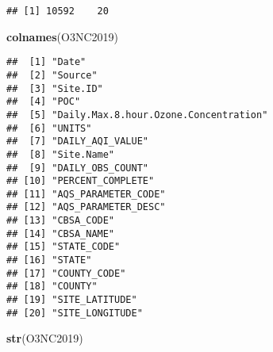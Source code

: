 \documentclass[]{article}
\newenvironment{Shaded}{\begin{snugshade}}{\end{snugshade}}
\newcommand{\KeywordTok}[1]{\textcolor[rgb]{0.13,0.29,0.53}{\textbf{#1}}}
\newcommand{\NormalTok}[1]{#1}
\begin{document}
\begin{verbatim}
## [1] 10592    20
\end{verbatim}

\begin{Shaded}
\begin{Highlighting}[]
\KeywordTok{colnames}\NormalTok{(O3NC2019)}
\end{Highlighting}
\end{Shaded}

\begin{verbatim}
##  [1] "Date"                                
##  [2] "Source"                              
##  [3] "Site.ID"                             
##  [4] "POC"                                 
##  [5] "Daily.Max.8.hour.Ozone.Concentration"
##  [6] "UNITS"                               
##  [7] "DAILY_AQI_VALUE"                     
##  [8] "Site.Name"                           
##  [9] "DAILY_OBS_COUNT"                     
## [10] "PERCENT_COMPLETE"                    
## [11] "AQS_PARAMETER_CODE"                  
## [12] "AQS_PARAMETER_DESC"                  
## [13] "CBSA_CODE"                           
## [14] "CBSA_NAME"                           
## [15] "STATE_CODE"                          
## [16] "STATE"                               
## [17] "COUNTY_CODE"                         
## [18] "COUNTY"                              
## [19] "SITE_LATITUDE"                       
## [20] "SITE_LONGITUDE"
\end{verbatim}

\begin{Shaded}
\begin{Highlighting}[]
\KeywordTok{str}\NormalTok{(O3NC2019)}
\end{Highlighting}
\end{Shaded}
\end{document}
